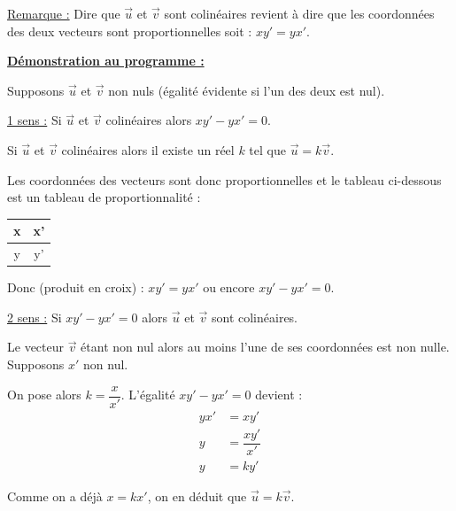 \documentclass[12pt]{article}
\begin{document}

\underline{Remarque :} Dire que $\overrightarrow{u}$ et $\overrightarrow{v}$ sont colinéaires 
revient à dire que les coordonnées des deux vecteurs sont proportionnelles soit :
$xy' = yx'$.

\begin{mdframed}[
    linewidth=1pt,
    roundcorner=5pt,
    linecolor=RoyalBlue,
    innertopmargin=10pt,
    innerbottommargin=10pt
]
{\color{RoyalBlue}\textbf{\underline{Démonstration au programme :}}}
\vspace{10pt}

Supposons $\overrightarrow{u}$ et $\overrightarrow{v}$ non nuls (égalité évidente 
si l'un des deux est nul).
\vspace{5pt}

\underline{1 sens :} Si $\overrightarrow{u}$ et $\overrightarrow{v}$ colinéaires 
alors $xy'-yx' = 0$.


Si $\overrightarrow{u}$ et $\overrightarrow{v}$ colinéaires alors il existe un réel 
$k$ tel que $\overrightarrow{u} = k \overrightarrow{v}$.

Les coordonnées des vecteurs sont donc proportionnelles et le tableau ci-dessous est 
un tableau de proportionnalité :
\begin{center}
    \begin{tabular}{|c|c|}
        \hline
        x & x' \\
        \hline
        y & y' \\
        \hline
    \end{tabular}
\end{center}

Donc (produit en croix) : $xy' = yx'$ ou encore $xy' - yx' = 0$.

\vspace{5pt}
\underline{2 sens :} Si $xy'-yx' = 0$  
alors $\overrightarrow{u}$ et $\overrightarrow{v}$ sont colinéaires.

\vspace{5pt}

Le vecteur $\overrightarrow{v}$ étant non nul alors au moins l'une de ses coordonnées 
est non nulle. Supposons $x'$ non nul.

On pose alors $k = \dfrac{x}{x'}$. L'égalité $xy'-yx' = 0$ devient :
\begin{align*}
yx' &= xy' \\
y &= \dfrac{xy'}{x'} \\
y &= ky'
\end{align*}

Comme on a déjà $x = kx'$, on en déduit que $\overrightarrow{u} = k \overrightarrow{v}$.


\end{mdframed}
\end{document}
